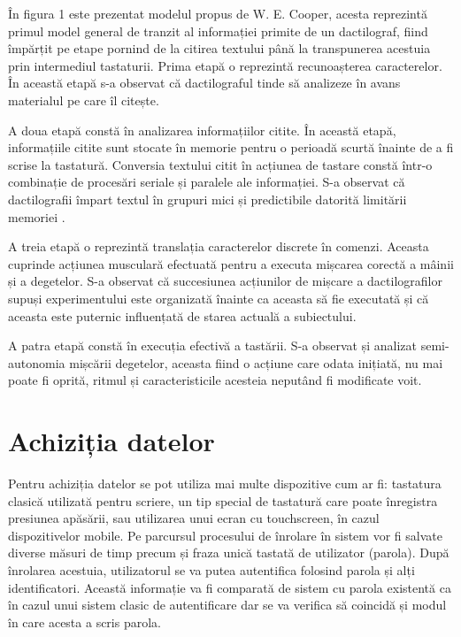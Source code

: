 \documentclass[9pt,shortpaper,twoside,web]{ieeecolor}
\begin{document}
	În figura 1 este prezentat modelul propus de W. E. Cooper, acesta reprezintă primul model general de tranzit al informației primite de un dactilograf, fiind împărțit pe etape pornind de la citirea textului până la transpunerea acestuia prin intermediul tastaturii. Prima etapă o reprezintă recunoașterea caracterelor. În această etapă s-a observat că dactilograful tinde să analizeze în avans materialul pe care îl citește.

	A doua etapă constă în analizarea informațiilor citite. În această etapă, informațiile citite sunt stocate în memorie pentru o perioadă scurtă înainte de a fi scrise la tastatură. Conversia textului citit în acțiunea de tastare constă într-o combinație de procesări seriale și paralele ale informației. S-a observat că dactilografii împart textul în grupuri mici și predictibile datorită limitării memoriei \cite{b6}.

	A treia etapă o reprezintă translația caracterelor discrete în comenzi. Aceasta cuprinde acțiunea musculară efectuată pentru a executa mișcarea corectă a mâinii și a degetelor. S-a observat că succesiunea acțiunilor de mișcare a dactilografilor supuși experimentului este organizată înainte ca aceasta să fie executată și că aceasta este puternic influențată de starea actuală a subiectului. 
	
	A patra etapă constă în execuția efectivă a tastării. S-a observat și analizat semi-autonomia mișcării degetelor, aceasta fiind o acțiune care odata inițiată, nu mai poate fi oprită, ritmul și caracteristicile acesteia neputând fi modificate voit. 



\section{Achiziția datelor}
	Pentru achiziția datelor se pot utiliza mai multe dispozitive cum ar fi: tastatura clasică utilizată pentru scriere, un tip special de tastatură care poate înregistra presiunea apăsării, sau utilizarea unui ecran cu touchscreen, în cazul dispozitivelor mobile. Pe parcursul procesului de înrolare în sistem vor fi salvate diverse măsuri de timp precum și fraza unică tastată de utilizator (parola). După înrolarea acestuia, utilizatorul se va putea autentifica folosind parola și alți identificatori. Această informație va fi comparată de sistem cu parola existentă ca în cazul unui sistem clasic de autentificare dar se va verifica să coincidă și modul în care acesta a scris parola.
	
\end{document}
